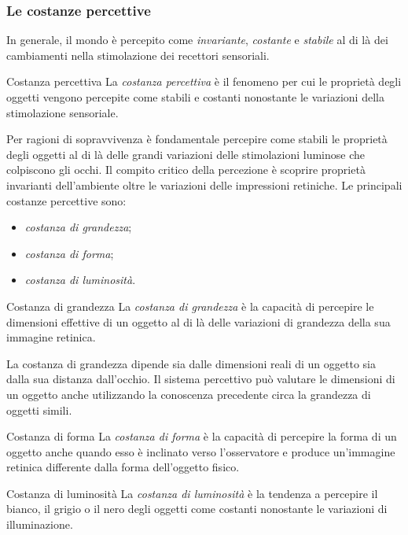 \documentclass[a4paper]{article}
\begin{document}
\subsubsection{Le costanze percettive}
In generale, il mondo è percepito come \emph{invariante}, \emph{costante} e \emph{stabile} al di là dei cambiamenti nella stimolazione dei recettori sensoriali.
\begin{snippetdefinition}{Costanza percettiva}
    La \emph{costanza percettiva} è il fenomeno per cui le proprietà degli oggetti vengono percepite come stabili e costanti nonostante le variazioni della stimolazione sensoriale.
\end{snippetdefinition}
Per ragioni di sopravvivenza è fondamentale percepire come stabili le proprietà degli oggetti al di là delle grandi variazioni delle stimolazioni luminose che colpiscono gli occhi. Il compito critico della percezione è scoprire proprietà invarianti dell'ambiente oltre le variazioni delle impressioni retiniche.
Le principali costanze percettive sono:
\begin{itemize}
    \item \emph{costanza di grandezza};
    \item \emph{costanza di forma};
    \item \emph{costanza di luminosità}.
\end{itemize}
\begin{snippetdefinition}{Costanza di grandezza}
    La \emph{costanza di grandezza} è la capacità di percepire le dimensioni effettive di un oggetto al di là delle variazioni di grandezza della sua immagine retinica.
\end{snippetdefinition}
La costanza di grandezza dipende sia dalle dimensioni reali di un oggetto sia dalla sua distanza dall'occhio. Il sistema percettivo può valutare le dimensioni di un oggetto anche utilizzando la conoscenza precedente circa la grandezza di oggetti simili.
\begin{snippetdefinition}{Costanza di forma}
    La \emph{costanza di forma} è la capacità di percepire la forma di un oggetto anche quando esso è inclinato verso l'osservatore e produce un'immagine retinica differente dalla forma dell'oggetto fisico.
\end{snippetdefinition}
\begin{snippetdefinition}{Costanza di luminosità}
    La \emph{costanza di luminosità} è la tendenza a percepire il bianco, il grigio o il nero degli oggetti come costanti nonostante le variazioni di illuminazione.
\end{snippetdefinition}
\end{document}
